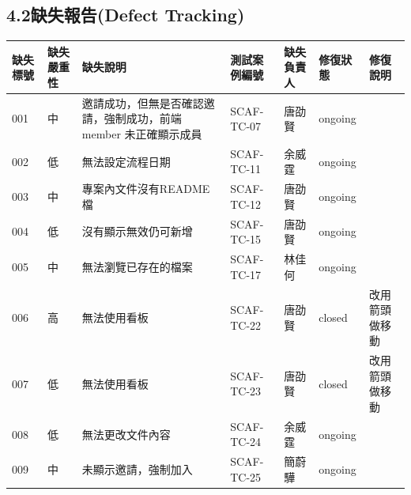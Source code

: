 \documentclass{report}
\begin{document}
\subsection*{4.2缺失報告(Defect Tracking)}
\begin{tabularx}{\textwidth}{ 
  |p{}%
  |p{}%
  |p{}%
  |p{}%
  |p{}%
  |p{}%
  |p{}|%
}
  \hline
  缺失標號 & 缺失嚴重性 & 缺失說明 & 測試案例編號 & 缺失負責人 & 修復狀態 & 修復說明\\
  \hline
  001 & 中 & 邀請成功，但無是否確認邀請，強制成功，前端 member 未正確顯示成員 & SCAF-TC-07 & 唐劭賢 &ongoing & \\
  \hline
  002 & 低 & 無法設定流程日期 & SCAF-TC-11 & 余威霆 & ongoing & \\
  \hline
  003 & 中 & 專案內文件沒有README檔 & SCAF-TC-12 & 唐劭賢 & ongoing & \\
  \hline
  004 & 低 & 沒有顯示無效仍可新增 & SCAF-TC-15 & 唐劭賢 & ongoing & \\
  \hline
  005 & 中 & 無法瀏覽已存在的檔案 & SCAF-TC-17 & 林佳何 & ongoing & \\
  \hline
  006 & 高 & 無法使用看板 & SCAF-TC-22 & 唐劭賢 & closed & 改用箭頭做移動 \\
  \hline
  007 & 低 & 無法使用看板 & SCAF-TC-23 & 唐劭賢 & closed & 改用箭頭做移動 \\
  \hline
  008 & 低 & 無法更改文件內容 & SCAF-TC-24 & 余威霆 & ongoing & \\
  \hline
  009 & 中 & 未顯示邀請，強制加入 & SCAF-TC-25 & 簡蔚驊 & ongoing & \\
  \hline
\end{tabularx}
\\
\newline
\\
\end{document}

